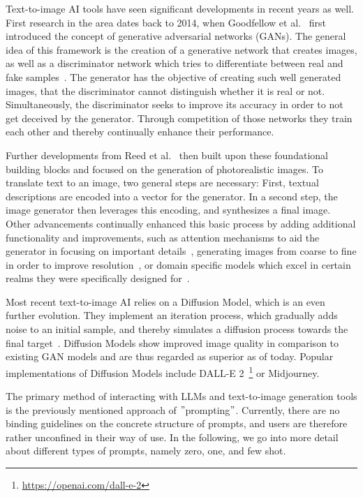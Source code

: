 Text-to-image AI tools have seen significant developments in recent years as well.
First research in the area dates back to 2014, when Goodfellow et al\(.\)~\cite{goodfellow_generative_2014,goodfellow_generative_2020}
first introduced the concept of generative adversarial networks (GANs).
The general idea of this framework is the creation of a generative network that creates
images, as well as a discriminator network which tries to differentiate between real and fake
samples~\cite{creswell_generative_2018}.
The generator has the objective of creating such well generated images, that the discriminator
cannot distinguish whether it is real or not.
Simultaneously, the discriminator seeks to improve its accuracy in order to not get deceived by
the generator.
Through competition of those networks they train each other and thereby continually enhance their
performance.

Further developments from Reed et al\(.\)~\cite{reed_generative_2016} then built upon these foundational
building blocks and focused on the generation of photorealistic images.
To translate text to an image, two general steps are necessary:
First, textual descriptions are encoded into a vector for the generator.
In a second step, the image generator then leverages this encoding, and synthesizes a final image.
Other advancements continually enhanced this basic process by adding additional
functionality and improvements, such as attention mechanisms to aid the generator in focusing on
important details~\cite{xu_attngan_2018}, generating images from coarse to fine in order to improve resolution~\cite{karras_progressive_2018},
or domain specific models which excel in certain realms they were specifically designed for~\cite{zhu_be_2017}.

Most recent text-to-image AI relies on a Diffusion Model, which is an even further evolution.
They implement an iteration process, which gradually adds noise to an initial sample, and
thereby simulates a diffusion process towards the final target~\cite{dhariwal_diffusion_2021}.
Diffusion Models show improved image quality in comparison to existing GAN models and are thus
regarded as superior as of today.
Popular implementations of Diffusion Models include DALL-E 2~\footnote{\url{https://openai.com/dall-e-2}} or Midjourney.
\newline

The primary method of interacting with LLMs and text-to-image generation tools is the previously
mentioned approach of \("\)prompting\("\).
Currently, there are no binding guidelines on the concrete structure of prompts,
and users are therefore rather unconfined in their way of use.
In the following, we go into more detail about different types of prompts, namely zero, one, and
few shot.

